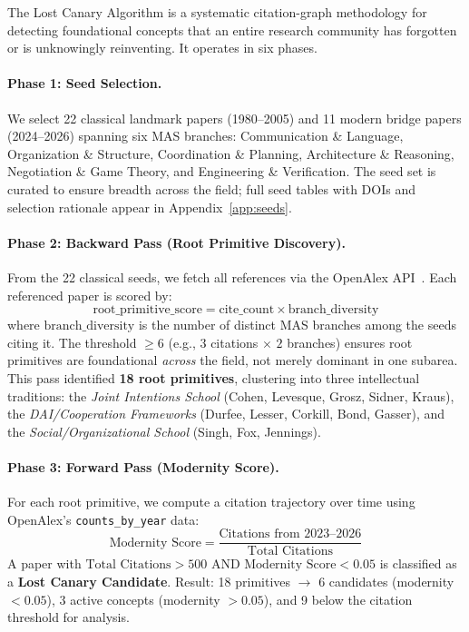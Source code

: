 \documentclass{article}
\begin{document}
The Lost Canary Algorithm is a systematic citation-graph methodology for detecting
foundational concepts that an entire research community has forgotten or is unknowingly
reinventing. It operates in six phases.

\paragraph{Phase 1: Seed Selection.}
We select 22 classical landmark papers (1980--2005) and 11 modern bridge papers
(2024--2026) spanning six MAS branches: Communication \& Language, Organization \&
Structure, Coordination \& Planning, Architecture \& Reasoning, Negotiation \& Game
Theory, and Engineering \& Verification. The seed set is curated to ensure breadth
across the field; full seed tables with DOIs and selection rationale appear in
Appendix~\ref{app:seeds}.

\paragraph{Phase 2: Backward Pass (Root Primitive Discovery).}
From the 22 classical seeds, we fetch all references via the OpenAlex
API~\citep{priem2022openalex}. Each referenced paper is scored by:
\begin{equation}
\textrm{root\_primitive\_score} = \textrm{cite\_count} \times \textrm{branch\_diversity}
\end{equation}
where $\textrm{branch\_diversity}$ is the number of distinct MAS branches among the
seeds citing it. The threshold $\geq 6$ (e.g., $3$ citations $\times$ $2$ branches)
ensures root primitives are foundational \emph{across} the field, not merely dominant
in one subarea. This pass identified \textbf{18 root primitives}, clustering into three
intellectual traditions: the \emph{Joint Intentions School} (Cohen, Levesque, Grosz,
Sidner, Kraus), the \emph{DAI/Cooperation Frameworks} (Durfee, Lesser, Corkill, Bond,
Gasser), and the \emph{Social/Organizational School} (Singh, Fox, Jennings).

\paragraph{Phase 3: Forward Pass (Modernity Score).}
For each root primitive, we compute a citation trajectory over time using OpenAlex's
\texttt{counts\_by\_year} data:
\begin{equation}
\textrm{Modernity Score} = \frac{\textrm{Citations from 2023--2026}}{\textrm{Total Citations}}
\end{equation}
A paper with $\textrm{Total Citations} > 500$ AND $\textrm{Modernity Score} < 0.05$
is classified as a \textbf{Lost Canary Candidate}. Result: 18 primitives $\to$ 6
candidates (modernity $< 0.05$), 3 active concepts (modernity $> 0.05$), and 9 below
the citation threshold for analysis.
\end{document}
